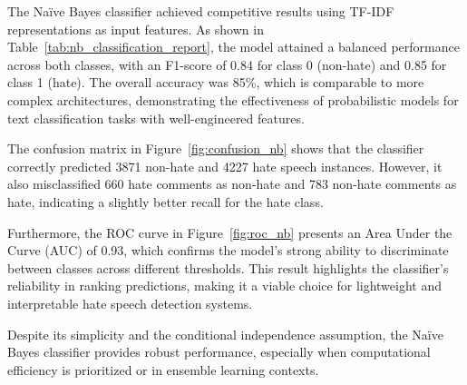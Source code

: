 The Naïve Bayes classifier achieved competitive results using TF-IDF representations as input features. As shown in Table~\ref{tab:nb_classification_report}, the model attained a balanced performance across both classes, with an F1-score of 0.84 for class 0 (non-hate) and 0.85 for class 1 (hate). The overall accuracy was 85\%, which is comparable to more complex architectures, demonstrating the effectiveness of probabilistic models for text classification tasks with well-engineered features.

The confusion matrix in Figure~\ref{fig:confusion_nb} shows that the classifier correctly predicted 3871 non-hate and 4227 hate speech instances. However, it also misclassified 660 hate comments as non-hate and 783 non-hate comments as hate, indicating a slightly better recall for the hate class.

Furthermore, the ROC curve in Figure~\ref{fig:roc_nb} presents an Area Under the Curve (AUC) of 0.93, which confirms the model’s strong ability to discriminate between classes across different thresholds. This result highlights the classifier’s reliability in ranking predictions, making it a viable choice for lightweight and interpretable hate speech detection systems.

Despite its simplicity and the conditional independence assumption, the Naïve Bayes classifier provides robust performance, especially when computational efficiency is prioritized or in ensemble learning contexts.